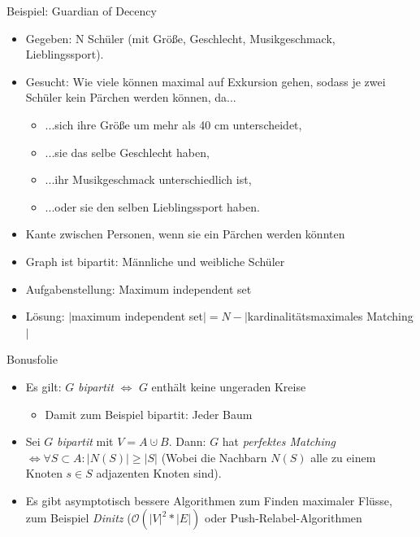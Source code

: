 \documentclass[18pt]{beamer}
\begin{document}
\begin{frame}{Beispiel: Guardian of Decency}
\begin{itemize}
\item Gegeben: N Sch\"uler (mit Gr\"o{\ss}e, Geschlecht, Musikgeschmack, Lieblingssport).
\item Gesucht: Wie viele k\"onnen maximal auf Exkursion gehen, sodass je zwei Sch\"uler kein P\"archen werden k\"onnen, da...
\begin{itemize}
	\item ...sich ihre Gr\"o{\ss}e um mehr als 40 cm unterscheidet,
	\item ...sie das selbe Geschlecht haben,
	\item ...ihr Musikgeschmack unterschiedlich ist,
	\item ...oder sie den selben Lieblingssport haben.
\end{itemize}

\pause

\item Kante zwischen Personen, wenn sie ein P\"archen werden k\"onnten
\item Graph ist bipartit: M\"annliche und weibliche Sch\"uler
\pause
\item Aufgabenstellung: Maximum independent set
\item L\"osung: $|$maximum independent set$| = N - |$kardinalit\"atsmaximales Matching$|$
\end{itemize}
\end{frame}

\begin{frame}{Bonusfolie}
\begin{itemize}
\item Es gilt: $G$ \textit{bipartit} $\Leftrightarrow$ $G$ enth\"alt keine ungeraden Kreise
\begin{itemize}
	\item Damit zum Beispiel bipartit: Jeder Baum
\end{itemize}
\item Sei $G$ \textit{bipartit} mit $V = A \cupdot B$. Dann: $G$ hat \textit{perfektes Matching} $\Leftrightarrow \forall S \subset A: |N(S)| \geq |S|$
(Wobei die Nachbarn $N(S)$ alle zu einem Knoten $s \in S$ adjazenten Knoten sind).
\item Es gibt asymptotisch bessere Algorithmen zum Finden maximaler Fl\"usse, zum Beispiel \textit{Dinitz} ($\mathcal{O}(|V|^{2} * |E|)$ oder Push-Relabel-Algorithmen
\end{itemize}
\end{frame}
\end{document}
